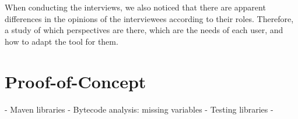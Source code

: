 When conducting the interviews, we also noticed that there are apparent differences in the opinions of the interviewees according to their roles. Therefore, a study of which perspectives are there, which are the needs of each user, and how to adapt the tool for them.

\section{Proof-of-Concept}

- Maven libraries
- Bytecode analysis: missing variables
- Testing libraries
-
